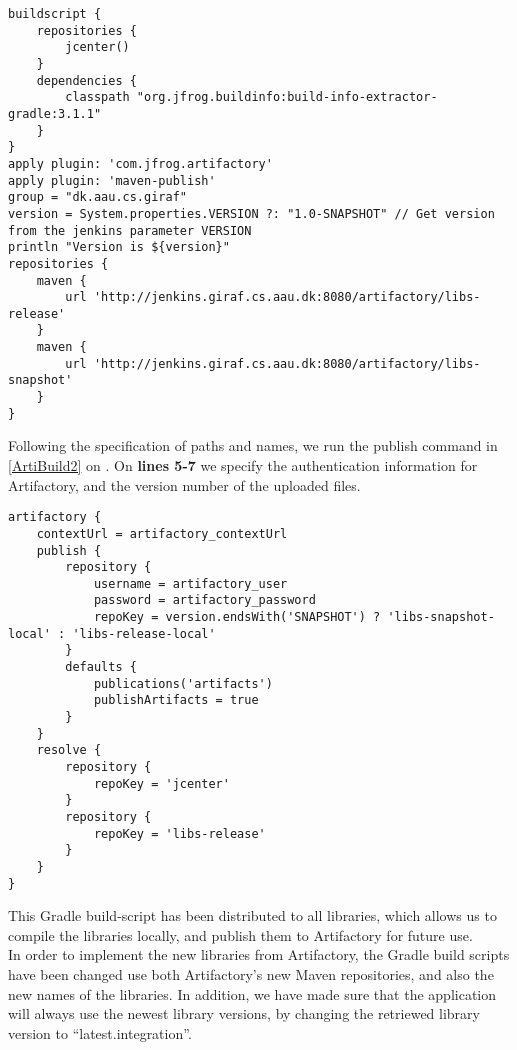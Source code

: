 \begin{minipage}[H]{\linewidth}
\begin{lstlisting}[caption = Specifying file names and subfolder paths on Artifactory, label = ArtiBuild1] 
buildscript {
    repositories {
        jcenter()
    }
    dependencies {
        classpath "org.jfrog.buildinfo:build-info-extractor-gradle:3.1.1"
    }
}
apply plugin: 'com.jfrog.artifactory'
apply plugin: 'maven-publish'
group = "dk.aau.cs.giraf"
version = System.properties.VERSION ?: "1.0-SNAPSHOT" // Get version from the jenkins parameter VERSION
println "Version is ${version}"
repositories {
    maven {
        url 'http://jenkins.giraf.cs.aau.dk:8080/artifactory/libs-release'
    }
    maven {
        url 'http://jenkins.giraf.cs.aau.dk:8080/artifactory/libs-snapshot'
    }
}
\end{lstlisting}
\end{minipage}

Following the specification of paths and names, we run the publish command in
\autoref{ArtiBuild2} on \label{lines 3-19}. On \textbf{lines 5-7} we specify the
authentication information for Artifactory, and the version number of the
uploaded files.\nl

\begin{minipage}[H]{\linewidth}
\begin{lstlisting}[caption = Publishing the compiled libraries to Artifactory, label = ArtiBuild2] 
artifactory {
    contextUrl = artifactory_contextUrl
    publish {
        repository {
            username = artifactory_user
            password = artifactory_password
            repoKey = version.endsWith('SNAPSHOT') ? 'libs-snapshot-local' : 'libs-release-local'
        }
        defaults {
            publications('artifacts')
            publishArtifacts = true
        }
    }
    resolve {
        repository {
            repoKey = 'jcenter'
        }
        repository {
            repoKey = 'libs-release'
        }
    }
}
\end{lstlisting}
\end{minipage}

This Gradle build-script has been distributed to all libraries, which allows us
to compile the libraries locally, and publish them to Artifactory for future
use.\\
In order to implement the new libraries from Artifactory, the Gradle
build scripts have been changed use both Artifactory's new Maven
repositories, and also the new names of the libraries. In addition, we have made
sure that the application will always use the newest library versions, by
changing the retriewed library version to ``latest.integration''.\nl

